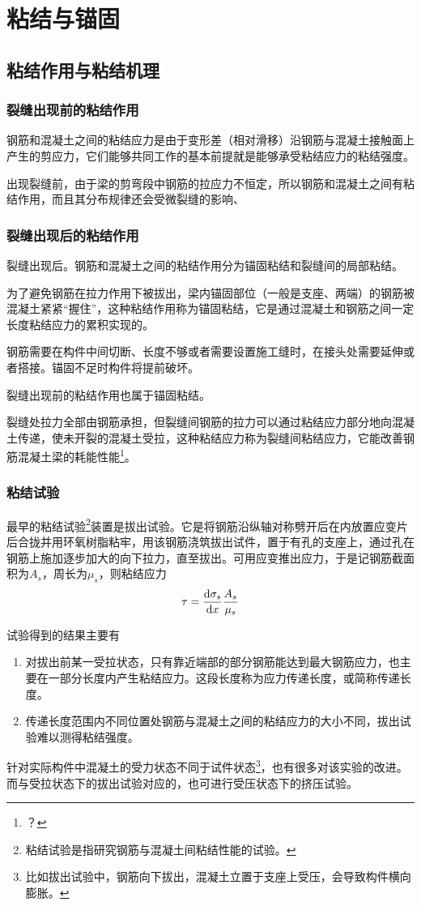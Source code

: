 \documentclass{article}
\begin{document}
\section{粘结与锚固}
\subsection{粘结作用与粘结机理}
\subsubsection{裂缝出现前的粘结作用}
\par 钢筋和混凝土之间的粘结应力是由于变形差（相对滑移）沿钢筋与混凝土接触面上产生的剪应力，它们能够共同工作的基本前提就是能够承受粘结应力的粘结强度。
\par 出现裂缝前，由于梁的剪弯段中钢筋的拉应力不恒定，所以钢筋和混凝土之间有粘结作用，而且其分布规律还会受微裂缝的影响、
\subsubsection{裂缝出现后的粘结作用}
\par 裂缝出现后。钢筋和混凝土之间的粘结作用分为锚固粘结和裂缝间的局部粘结。
\par 为了避免钢筋在拉力作用下被拔出，梁内锚固部位（一般是支座、两端）的钢筋被混凝土紧紧“握住”，这种粘结作用称为锚固粘结，它是通过混凝土和钢筋之间一定长度粘结应力的累积实现的。
\par 钢筋需要在构件中间切断、长度不够或者需要设置施工缝时，在接头处需要延伸或者搭接。锚固不足时构件将提前破坏。
\par 裂缝出现前的粘结作用也属于锚固粘结。
\par 裂缝处拉力全部由钢筋承担，但裂缝间钢筋的拉力可以通过粘结应力部分地向混凝土传递，使未开裂的混凝土受拉，这种粘结应力称为裂缝间粘结应力，它能改善钢筋混凝土梁的耗能性能\footnote{？}。
\subsubsection{粘结试验}
\par 最早的粘结试验\footnote{粘结试验是指研究钢筋与混凝土间粘结性能的试验。}装置是拔出试验。它是将钢筋沿纵轴对称劈开后在内放置应变片后合拢并用环氧树脂粘牢，用该钢筋浇筑拔出试件，置于有孔的支座上，通过孔在钢筋上施加逐步加大的向下拉力，直至拔出。可用应变推出应力，于是记钢筋截面积为$A_s$，周长为$\mu_s$，则粘结应力
$$\tau=\derivative{\sigma_s}{x}\frac{A_s}{\mu_s}$$
\par 试验得到的结果主要有
\begin{enumerate}
      \item 对拔出前某一受拉状态，只有靠近端部的部分钢筋能达到最大钢筋应力，也主要在一部分长度内产生粘结应力。这段长度称为应力传递长度，或简称传递长度。
      \item 传递长度范围内不同位置处钢筋与混凝土之间的粘结应力的大小不同，拔出试验难以测得粘结强度。
\end{enumerate}
\par 针对实际构件中混凝土的受力状态不同于试件状态\footnote{比如拔出试验中，钢筋向下拔出，混凝土立置于支座上受压，会导致构件横向膨胀。}，也有很多对该实验的改进。而与受拉状态下的拔出试验对应的，也可进行受压状态下的挤压试验。
\end{document}
